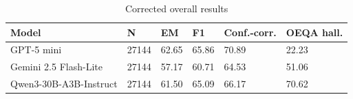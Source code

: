 \begin{table}[t]
\centering
\small
\begin{tabular}{llllll}
\toprule
Model & N & EM & F1 & Conf.-corr. & OEQA hall. \\
\midrule
GPT-5 mini & 27144 & 62.65 & 65.86 & 70.89 & 22.23 \\
Gemini 2.5 Flash-Lite & 27144 & 57.17 & 60.71 & 64.53 & 51.06 \\
Qwen3-30B-A3B-Instruct & 27144 & 61.50 & 65.09 & 66.17 & 70.62 \\
\bottomrule
\end{tabular}
\caption{Corrected overall results}
\label{tab:core-v11-corrected-overall-by-model}
\end{table}
